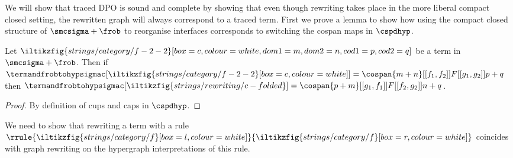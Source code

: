 We will show that traced DPO is sound and complete by showing that even though
rewriting takes place in the more liberal compact closed setting, the rewritten
graph will always correspond to a traced term.
First we prove a lemma to show how using the compact closed structure of
\(\smcsigma + \frob\) to reorganise interfaces corresponds to switching the
cospan maps in \(\cspdhyp\).

\begin{lemma}\label{lem:switch-interfaces}
    Let \(
    \iltikzfig{strings/category/f-2-2}[box=c,colour=white,dom1=m,dom2=n,cod1=p,cod2=q]
    \) be a term in \(\smcsigma + \frob\).
    Then if \(
    \termandfrobtohypsigmac[
        \iltikzfig{strings/category/f-2-2}[box=c,colour=white]
    ]
    =
    \cospan{m + n}[[f_1,f_2]]{F}[[g_1,g_2]]{p + q}
    \) then \(
    \termandfrobtohypsigmac[
        \iltikzfig{strings/rewriting/c-folded}
    ]
    =
    \cospan{p + m}[[g_1,f_1]]{F}[[f_2,g_2]]{n + q}
    \).
\end{lemma}
\begin{proof}
    By definition of cups and caps in \(\cspdhyp\).
\end{proof}

We need to show that rewriting a term with a rule \(\rrule{
    \iltikzfig{strings/category/f}[box=l,colour=white]
}{
    \iltikzfig{strings/category/f}[box=r,colour=white]
}\) coincides with graph rewriting on the hypergraph interpretations of
this rule.

